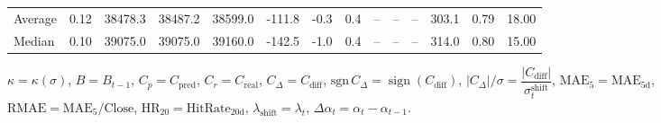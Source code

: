 \begin{threeparttable}
{\begin{tabular}{lrrrrrrrrrrrrr}
Average &     0.12 & 38478.3 & 38487.2 & 38599.0 &     -111.8 &                     -0.3 &                 0.4 &         -- &        -- &             -- &            303.1 &            0.79 &                  18.00 \\
 Median &     0.10 & 39075.0 & 39075.0 & 39160.0 &     -142.5 &                     -1.0 &                 0.4 &         -- &        -- &             -- &            314.0 &            0.80 &                  15.00 \\
\bottomrule
\end{tabular}
}
\begin{tablenotes}\footnotesize
\item $\kappa=\kappa(\sigma)$, $B=B_{t-1}$, $C_p=C_{\text{pred}}$, $C_r=C_{\text{real}}$, $C_\Delta=C_{\text{diff}}$, $\mathrm{sgn}\,C_\Delta=\operatorname{sign}(C_{\text{diff}})$, $|C_\Delta|/\sigma=\dfrac{|C_{\text{diff}}|}{\sigma_t^{\text{shift}}}$, $\mathrm{MAE}_5=\mathrm{MAE}_{5\text{d}}$, $\mathrm{RMAE}= \mathrm{MAE}_5 / \text{Close}$, $\mathrm{HR}_{20}=\mathrm{HitRate}_{20\text{d}}$, 
$\lambda_{\text{shift}}=\lambda_t$, 
$\Delta\alpha_t=\alpha_t-\alpha_{t-1}$.
\end{tablenotes}
\end{threeparttable}
\endgroup

